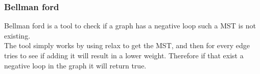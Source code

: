 \documentclass[12pt, a4paper]{article}
\begin{document}
			\subsubsection{Bellman ford}
				Bellman ford is a tool to check if a graph has a negative loop such a MST is not existing.\\
				The tool simply works by using relax to get the MST, and then for every edge tries to see if adding it will result in a lower weight. Therefore if that exist a negative loop in the graph it will return true.
						
				
			
				
	
				
\end{document}
